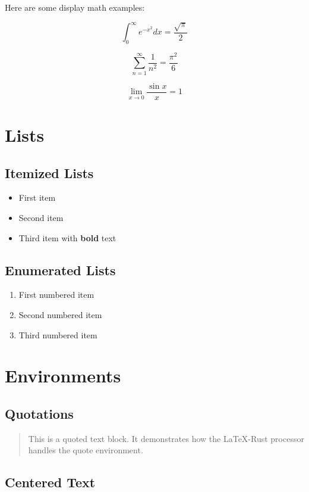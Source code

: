\documentclass{article}
\begin{document}
Here are some display math examples:

$$\int_0^\infty e^{-x^2} dx = \frac{\sqrt{\pi}}{2}$$

$$\sum_{n=1}^\infty \frac{1}{n^2} = \frac{\pi^2}{6}$$

$$\lim_{x \to 0} \frac{\sin x}{x} = 1$$

\section{Lists}

\subsection{Itemized Lists}

\begin{itemize}
\item First item
\item Second item
\item Third item with \textbf{bold} text
\end{itemize}

\subsection{Enumerated Lists}

\begin{enumerate}
\item First numbered item
\item Second numbered item
\item Third numbered item
\end{enumerate}

\section{Environments}

\subsection{Quotations}

\begin{quote}
This is a quoted text block. It demonstrates how the LaTeX-Rust processor handles the quote environment.
\end{quote}

\subsection{Centered Text}
\end{document}
